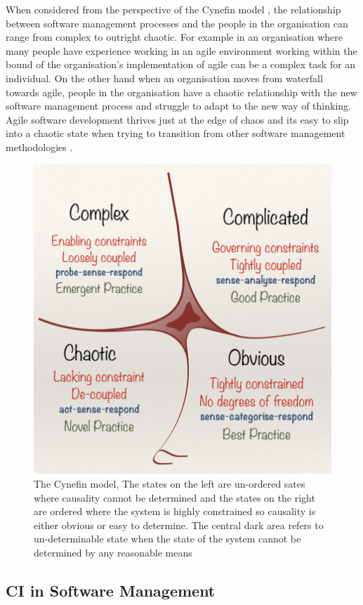 \documentclass[12pt,conference]{IEEEtran}
\begin{document}
When considered from the perspective of the Cynefin model \cite{snowden_cynefin_????}, the relationship between software management processes and the people in the organisation can range from complex to outright chaotic. For example in an organisation where many people have experience working in an agile environment working within the bound of the organisation's implementation of agile can be a complex task for an individual. On the other hand when an organisation moves from waterfall towards agile, people in the organisation have a chaotic relationship with the new software management process and struggle to adapt to the new way of thinking. Agile software development thrives just at the edge of chaos and its easy to slip into a chaotic state when trying to transition from other software management methodologies \cite{kautz_just_2008}. 


\begin{figure}[hbtp]
\includegraphics[scale=0.55]{cynefin.png}
\caption{The Cynefin model, The states on the left are un-ordered sates where causality cannot be determined and the states on the right are ordered where the system is highly constrained so causality is either obvious or easy to determine. The central dark area refers to un-determinable state when the state of the system cannot be determined by any reasonable means  \cite{snowden_leaders_2007}}
\label{cynefin}
\end{figure}

\subsection*{CI in Software Management}
\end{document}
